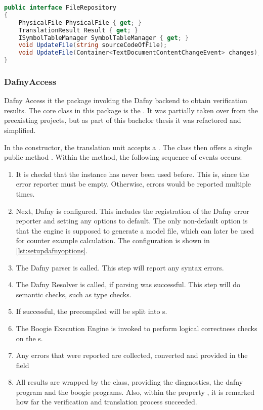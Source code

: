 \begin{lstlisting}[language=csharp, caption={Handling Compilation}, captionpos=b, label={lst:handlecompilation}]
public interface FileRepository
{
    PhysicalFile PhysicalFile { get; }
    TranslationResult Result { get; }
    ISymbolTableManager SymbolTableManager { get; }
    void UpdateFile(string sourceCodeOfFile);
    void UpdateFile(Container<TextDocumentContentChangeEvent> changes);
}
\end{lstlisting}


\subsubsection{DafnyAccess}
Dafny Access it the package invoking the Dafny backend to obtain verification results.
The core class in this package is the .
It was partially taken over from the preexisting projects, but as part of this bachelor thesis it was refactored and simplified.

In the constructor, the translation unit accepts a .
The class then offers a single public method .
Within the method, the following sequence of events occurs:
\begin{enumerate}
    \item It is checkd that the instance has never been used before.
    This is, since the error reporter must be empty.
    Otherwise, errors would be reported multiple times.
    \item Next, Dafny is configured.
    This includes the registration of the Dafny error reporter and setting any options to default.
    The only non-default option is that the engine is supposed to generate a model file, which can later be used for counter example calculation.
    The configuration is shown in \ref{lst:setupdafnyoptions}.
    \item The Dafny parser is called.
    This step will report any syntax errors.
    \item The Dafny Resolver is called, if parsing was successful.
    This step will do semantic checks, such as type checks.
    \item If successful, the precompiled  will be split into s.
    \item The Boogie Execution Engine is invoked to perform logical correctness checks on the s.
    \item Any errors that were reported are collected, converted and provided in the field 
    \item All results are wrapped by the  class, providing the diagnostics, the dafny program and the boogie programs.
    Also, within the property , it is remarked how far the verification and translation process succeeded.
\end{enumerate}

